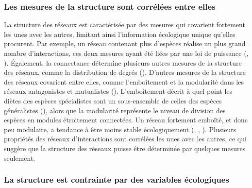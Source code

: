 \subsubsection{Les mesures de la structure sont corrélées entre elles} 

La structure des réseaux est caractérisée par des mesures qui covarient
fortement les unes avec les autres, limitant ainsi l'information écologique
unique qu'elles procurent. Par exemple, un réseau contenant plus d'espèces
réalise un plus grand nombre d'interactions, ces deux mesures ayant été liées
par une loi de puissance (\cite{Brose2004Unified}, \cite{Riede2010Chapter}).
Également, la connectance détermine plusieurs autres mesures de la structure des
réseaux, comme la distribution de degrés (\cite{Poisot2014When}). D'autres
mesures de la structure des réseaux covarient entre elles, comme l'emboîtement
et la modularité dans les réseaux antagonistes et mutualistes
(\cite{Fortuna2010Nestedness}). L'emboîtement décrit à quel point les diètes des
espèces spécialistes sont un sous-ensemble de celles des espèces généralistes
(\cite{Staniczenko2013Ghost}), alors que la modularité représente le niveau de
division des espèces en modules étroitement connectées. Un réseau fortement
emboîté, et donc peu modulaire, a tendance à être moins stable écologiquement
(\cite{Okuyama2008Network}, \cite{Bastolla2009Architecture},
\cite{Thebault2010Stability}). Plusieurs propriétés des réseaux d'interactions
sont corrélées les unes avec les autres, ce qui suggère que la structure des
réseaux puisse être déterminée par quelques mesures seulement.

\subsubsection{La structure est contrainte par des variables écologiques} 

